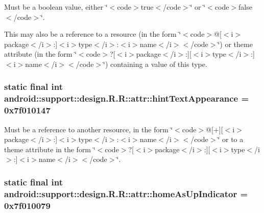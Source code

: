 Must be a boolean value, either \char`\"{}$<$code$>$true$<$/code$>$\char`\"{} or \char`\"{}$<$code$>$false$<$/code$>$\char`\"{}. 

This may also be a reference to a resource (in the form \char`\"{}$<$code$>$@\mbox{[}$<$i$>$package$<$/i$>$:\mbox{]}$<$i$>$type$<$/i$>$:$<$i$>$name$<$/i$>$$<$/code$>$\char`\"{}) or theme attribute (in the form \char`\"{}$<$code$>$?\mbox{[}$<$i$>$package$<$/i$>$:\mbox{]}\mbox{[}$<$i$>$type$<$/i$>$:\mbox{]}$<$i$>$name$<$/i$>$$<$/code$>$\char`\"{}) containing a value of this type. \hypertarget{classandroid_1_1support_1_1design_1_1_r_1_1attr_b3b883e6be5500115a0cdd5f7df9a85c}{
\subsubsection[{hintTextAppearance}]{\setlength{\rightskip}{0pt plus 5cm}static final int android::support::design.R.R::attr::hintTextAppearance = 0x7f010147}}
\label{classandroid_1_1support_1_1design_1_1_r_1_1attr_b3b883e6be5500115a0cdd5f7df9a85c}


Must be a reference to another resource, in the form \char`\"{}$<$code$>$@\mbox{[}+\mbox{]}\mbox{[}$<$i$>$package$<$/i$>$:\mbox{]}$<$i$>$type$<$/i$>$:$<$i$>$name$<$/i$>$$<$/code$>$\char`\"{} or to a theme attribute in the form \char`\"{}$<$code$>$?\mbox{[}$<$i$>$package$<$/i$>$:\mbox{]}\mbox{[}$<$i$>$type$<$/i$>$:\mbox{]}$<$i$>$name$<$/i$>$$<$/code$>$\char`\"{}. \hypertarget{classandroid_1_1support_1_1design_1_1_r_1_1attr_d7d9264fc9d4738be4deef7c5236ef8a}{
\subsubsection[{homeAsUpIndicator}]{\setlength{\rightskip}{0pt plus 5cm}static final int android::support::design.R.R::attr::homeAsUpIndicator = 0x7f010079}}
\label{classandroid_1_1support_1_1design_1_1_r_1_1attr_d7d9264fc9d4738be4deef7c5236ef8a}


